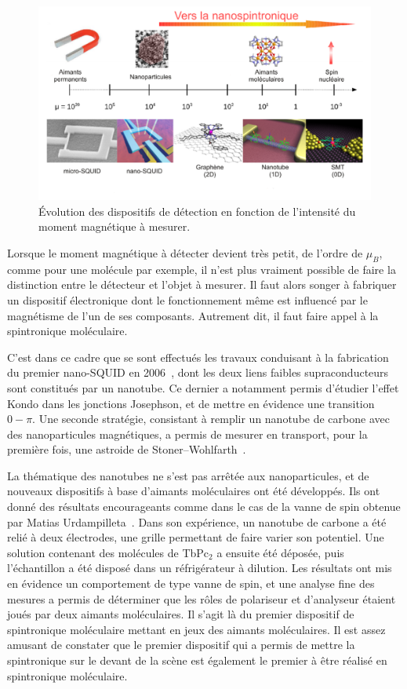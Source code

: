 \begin{figure}
\centering \includegraphics[scale=0.45]{Spintronique/Group1/Group1.pdf}
\caption{\'Evolution des dispositifs de détection en fonction de l'intensité du moment magnétique à mesurer.}
\label{Group1}
\end{figure}



Lorsque le moment magnétique à détecter devient très petit, de l'ordre de $\mu_B$, comme pour une molécule par exemple, il n'est plus vraiment possible de faire la distinction entre le détecteur et l'objet à mesurer. Il faut alors songer à fabriquer un dispositif électronique dont le fonctionnement même est influencé par le magnétisme de l'un de ses composants. Autrement dit, il faut faire appel à la spintronique moléculaire.

C'est dans ce cadre que se sont effectués les travaux conduisant à la fabrication du premier nano-SQUID en 2006~\cite{CleuziouJ.-P.2006}, dont les deux liens faibles supraconducteurs sont constitués par un nanotube. Ce dernier a notamment permis d'étudier l'effet Kondo dans les jonctions Josephson, et de mettre en évidence une transition $0-\pi$. Une seconde stratégie, consistant à remplir un nanotube de carbone avec des nanoparticules magnétiques, a permis de mesurer en transport, pour la première fois, une astroide de Stoner–Wohlfarth~\cite{Cleuziou2011}.

La thématique des nanotubes ne s'est pas arrêtée aux nanoparticules, et de nouveaux dispositifs à base d'aimants moléculaires ont été développés. Ils ont donné des résultats encourageants comme dans le cas de la vanne de spin obtenue par Matias Urdampilleta~\cite{Urdampilleta2011}. Dans son expérience, un nanotube de carbone a été relié à deux électrodes, une grille permettant de faire varier son potentiel. Une solution contenant des molécules de TbPc$_{2}$ a ensuite été déposée, puis l'échantillon a été disposé dans un réfrigérateur à dilution. Les résultats ont mis en évidence un comportement de type vanne de spin, et une analyse fine des mesures a permis de déterminer que les rôles de polariseur et d'analyseur étaient joués par deux aimants moléculaires. Il s'agit là du premier dispositif de spintronique moléculaire mettant en jeux des aimants moléculaires. Il est assez amusant de constater que le premier dispositif qui a permis de mettre la spintronique sur le devant de la scène est également le premier à être réalisé en spintronique moléculaire.

